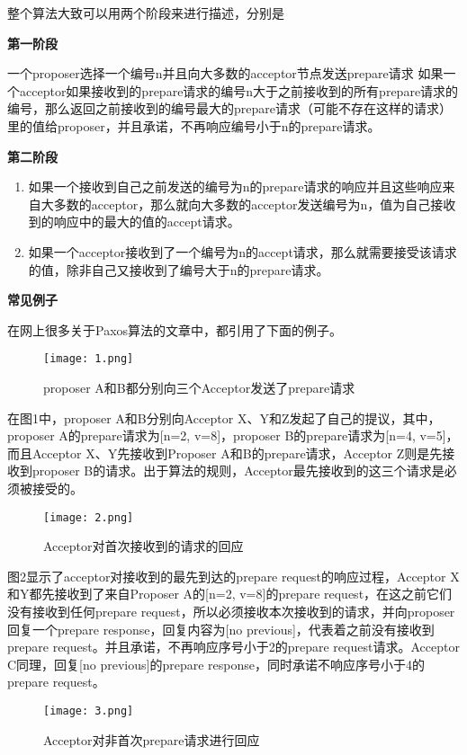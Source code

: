 \documentclass{article}
\begin{document}
整个算法大致可以用两个阶段来进行描述，分别是

	\textbf{第一阶段}

	一个proposer选择一个编号n并且向大多数的acceptor节点发送prepare请求
	如果一个acceptor如果接收到的prepare请求的编号n大于之前接收到的所有prepare请求的编号，那么返回之前接收到的编号最大的prepare请求（可能不存在这样的请求）里的值给proposer，并且承诺，不再响应编号小于n的prepare请求。

	\textbf{第二阶段}
        \begin{enumerate}
	\item 如果一个接收到自己之前发送的编号为n的prepare请求的响应并且这些响应来自大多数的acceptor，那么就向大多数的acceptor发送编号为n，值为自己接收到的响应中的最大的值的accept请求。
        \item 如果一个acceptor接收到了一个编号为n的accept请求，那么就需要接受该请求的值，除非自己又接收到了编号大于n的prepare请求。
        \end{enumerate}


\textbf{常见例子}

在网上很多关于Paxos算法的文章中，都引用了下面的例子。

\begin{figure}[hb]
	\centering
	\texttt{[image: 1.png]}
	\caption{proposer A和B都分别向三个Acceptor发送了prepare请求}
	\label{fig:label}
\end{figure}

在图1中，proposer A和B分别向Acceptor X、Y和Z发起了自己的提议，其中，proposer A的prepare请求为[n=2, v=8]，proposer B的prepare请求为[n=4, v=5]，而且Acceptor X、Y先接收到Proposer A和B的prepare请求，Acceptor Z则是先接收到proposer B的请求。出于算法的规则，Acceptor最先接收到的这三个请求是必须被接受的。


\begin{figure}[ht]
	\centering
	\texttt{[image: 2.png]}
	\caption{Acceptor对首次接收到的请求的回应}
	\label{fig:label}
\end{figure}
图2显示了acceptor对接收到的最先到达的prepare request的响应过程，Acceptor X和Y都先接收到了来自Proposer A的[n=2, v=8]的prepare request，在这之前它们没有接收到任何prepare request，所以必须接收本次接收到的请求，并向proposer回复一个prepare response，回复内容为[no previous]，代表着之前没有接收到prepare request。并且承诺，不再响应序号小于2的prepare request请求。Acceptor C同理，回复[no previous]的prepare response，同时承诺不响应序号小于4的prepare request。

\begin{figure}[h]
	\centering
	\texttt{[image: 3.png]}
	\caption{Acceptor对非首次prepare请求进行回应}
	\label{fig:label}
\end{figure}
\end{document}
